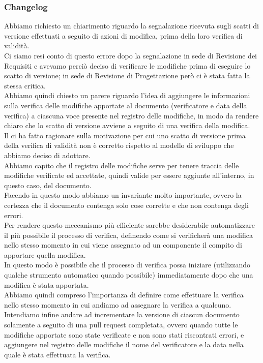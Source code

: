 	\subsubsection*{Changelog}
	Abbiamo richiesto un chiarimento riguardo la segnalazione ricevuta sugli scatti di versione effettuati a seguito di azioni di modifica, prima della loro verifica di validità. \\
	Ci siamo resi conto di questo errore dopo la segnalazione in sede di Revisione dei Requisiti e avevamo perciò deciso di verificare le modifiche prima di eseguire lo scatto di versione; in sede di Revisione di Progettazione però ci è stata fatta la stessa critica. \\
	Abbiamo quindi chiesto un parere riguardo l'idea di aggiungere le informazioni sulla verifica delle modifiche apportate al documento (verificatore e data della verifica) a ciascuna voce presente nel registro delle modifiche, in modo da rendere chiaro che lo scatto di versione avviene a seguito di una verifica della modifica. \\
	Il \TV{} ci ha fatto ragionare sulla motivazione per cui uno scatto di versione prima della verifica di validità non è corretto rispetto al modello di sviluppo che abbiamo deciso di adottare. \\
	Abbiamo capito che il registro delle modifiche serve per tenere traccia delle modifiche verificate ed accettate, quindi valide per essere aggiunte all'interno, in questo caso, del documento. \\
	Facendo in questo modo abbiamo un invariante molto importante, ovvero la certezza che il documento contenga solo cose corrette e che non contenga degli errori. \\
	Per rendere questo meccanismo più efficiente sarebbe desiderabile automatizzare il più possibile il processo di verifica, definendo come si verificherà una modifica nello stesso momento in cui viene assegnato ad un componente il compito di apportare quella modifica. \\
	In questo modo è possibile che il processo di verifica possa iniziare (utilizzando qualche strumento automatico quando possibile) immediatamente dopo che una modifica è stata apportata. \\
	Abbiamo quindi compreso l'importanza di definire come effettuare la verifica nello stesso momento in cui andiamo ad assegnare la verifica a qualcuno. \\
	Intendiamo infine andare ad incrementare la versione di ciascun documento solamente a seguito di una pull request completata, ovvero quando tutte le modifiche apportate sono state verificate e non sono stati riscontrati errori, e aggiungere nel registro delle modifiche il nome del verificatore e la data nella quale è stata effettuata la verifica.

	
	
	